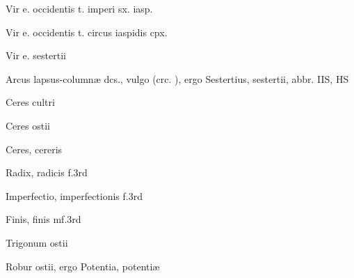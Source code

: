  {} {\mktsStyleItalic{}Vir e. occidentis t. imperi sx. iasp.\/}


 {} {\mktsStyleItalic{}Vir e. occidentis t. circus iaspidis cpx.\/}


 {\mktsStyleItalic{}Vir e. sestertii\/}


 {\mktsStyleItalic{}Arcus lapsus-columnæ dcs.\/}, vulgo {\/} (crc. {\/}), ergo {\mktsStyleItalic{}Sestertius\/}, sestertii, abbr. IIS, HS


 {\mktsStyleItalic{}Ceres cultri\/}


 {\mktsStyleItalic{}Ceres ostii\/}


 {\mktsStyleItalic{}Ceres\/}, cereris


 {\mktsStyleItalic{}Radix\/}, radicis {\mktsStyleItalic{}f.3rd\/}


 {\mktsStyleItalic{}Imperfectio\/}, imperfectionis {\mktsStyleItalic{}f.3rd\/}


 {\mktsStyleItalic{}Finis\/}, finis {\mktsStyleItalic{}mf.3rd\/}


 {\mktsStyleItalic{}Trigonum ostii\/}


 {\mktsStyleItalic{}Robur ostii\/}, ergo {\mktsStyleItalic{}Potentia\/}, potentiæ


